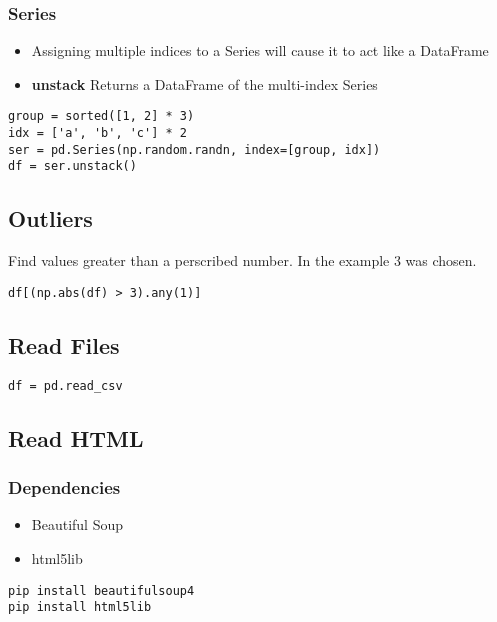 %
\subsubsection{Series}
\begin{itemize}
  \item Assigning multiple indices to a Series will cause it to act like a
    DataFrame

  \item \textbf{unstack} Returns a DataFrame of the multi-index Series
\end{itemize}
\begin{lstlisting}
group = sorted([1, 2] * 3)
idx = ['a', 'b', 'c'] * 2
ser = pd.Series(np.random.randn, index=[group, idx])
df = ser.unstack()
\end{lstlisting}

\subsection{Outliers}
Find values greater than a perscribed number. In the example 3 was chosen.

\begin{lstlisting}
df[(np.abs(df) > 3).any(1)]
\end{lstlisting}

\subsection{Read Files}
\begin{lstlisting}
df = pd.read_csv
\end{lstlisting}

\subsection{Read HTML}

%
\subsubsection{Dependencies}
\begin{itemize}

  \item Beautiful Soup

  \item html5lib
\end{itemize}
\begin{lstlisting}
pip install beautifulsoup4
pip install html5lib
\end{lstlisting}

